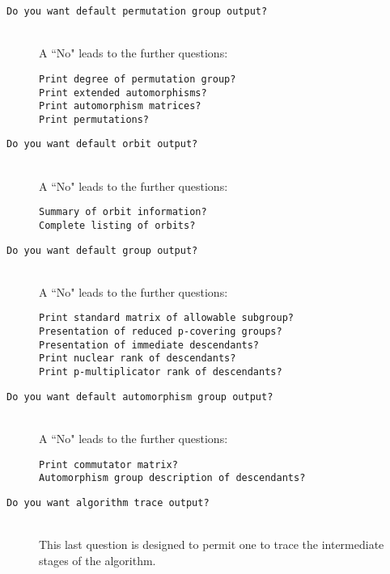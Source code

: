 \documentclass[12pt]{article}
\begin{document}
\begin{description}
 \begin{description}
 \item[\texttt{Do you want default permutation group output?}]\ \\
 A ``No" leads to the further questions:
  \begin{description}
   \item[\texttt{Print degree of permutation group?}]
   \item[\texttt{Print extended automorphisms?}]
   \item[\texttt{Print automorphism matrices?}]
   \item[\texttt{Print permutations?}]
  \end{description}
 \item[\texttt{Do you want default orbit output?}]\ \\
 A ``No" leads to the further questions:
  \begin{description}
   \item[\texttt{Summary of orbit information?}]
   \item[\texttt{Complete listing of orbits?}]
  \end{description}
 \item[\texttt{Do you want default group output?}]\ \\
 A ``No" leads to the further questions:
  \begin{description}
   \item[\texttt{Print standard matrix of allowable subgroup?}]
   \item[\texttt{Presentation of reduced p-covering groups?}]
   \item[\texttt{Presentation of immediate descendants?}]
   \item[\texttt{Print nuclear rank of descendants?}]
   \item[\texttt{Print p-multiplicator rank of descendants?}]
  \end{description}
 \item[\texttt{Do you want default automorphism group output?}]\ \\
 A ``No" leads to the further questions:
  \begin{description}
   \item[\texttt{Print commutator matrix?}]
   \item[\texttt{Automorphism group description of descendants?}]
  \end{description}
 \item[\texttt{Do you want algorithm trace output?}]\ \\
 This last question is designed to permit
 one to trace the intermediate stages of the algorithm.
 \end{description}
\end{description}
\end{document}
